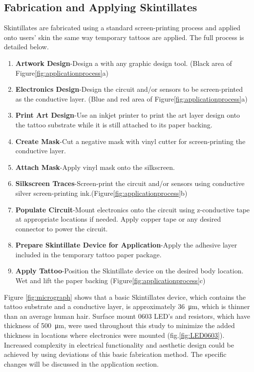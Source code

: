 \documentclass{sigchi}
\begin{document}
\subsection{Fabrication and Applying Skintillates}
Skintillates are fabricated using a standard screen-printing process and applied onto users’ skin the same way temporary tattoos are applied. The full process is detailed below.
\begin{enumerate}
  \item \textbf{Artwork Design}-Design a with any graphic design tool. (Black area of Figure\ref{fig:applicationprocess}a)
  \item \textbf{Electronics Design}-Design the circuit and/or sensors to be screen-printed as the conductive layer. (Blue and red area  of Figure\ref{fig:applicationprocess}a) 
  \item \textbf{Print Art Design}-Use an inkjet printer to print the art layer design onto the tattoo substrate while it is still attached to its paper backing. 
  \item \textbf{Create Mask}-Cut a negative mask with vinyl cutter for screen-printing the conductive layer.
  \item \textbf{Attach Mask}-Apply vinyl mask onto the silkscreen.
  \item \textbf{Silkscreen Traces}-Screen-print the circuit and/or sensors using conductive silver screen-printing ink.(Figure\ref{fig:applicationprocess}b) 
  \item \textbf{Populate Circuit}-Mount electronics onto the circuit using z-conductive tape at appropriate locations if needed. Apply copper tape or any desired connector to power the circuit. 
  \item \textbf{Prepare Skintillate Device for Application}-Apply the adhesive layer included in the temporary tattoo paper package.
  \item \textbf{Apply Tattoo}-Position the Skintillate device on the desired body location. Wet and lift the paper backing (Figure\ref{fig:applicationprocess}c) 
\end{enumerate}
Figure \ref{fig:micrograph} shows that a basic Skintillates device, which contains the tattoo substrate and a conductive layer, is approximately 36\SI{}{\micro\metre}, which is thinner than an average human hair. Surface mount 0603 LED's and resistors, which have thickness of  \SI{500}{\micro\metre}, were used throughout this study to minimize the added thickness in locations where electronics were mounted (fig.\ref{fig:LED0603}). Increased complexity in electrical functionality and aesthetic design could be achieved by using deviations of this basic fabrication method. The specific changes will be discussed in the application section. 
\end{document}
